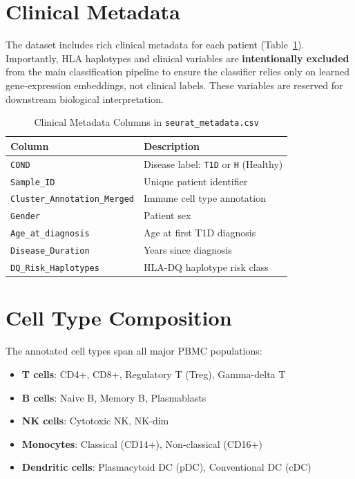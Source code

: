 \section{Clinical Metadata}

The dataset includes rich clinical metadata for each patient (Table~\ref{tab:metadata}). Importantly, HLA haplotypes and clinical variables are \textbf{intentionally excluded} from the main classification pipeline to ensure the classifier relies only on learned gene-expression embeddings, not clinical labels. These variables are reserved for downstream biological interpretation.

\begin{table}[h!]
\centering
\caption{Clinical Metadata Columns in \texttt{seurat\_metadata.csv}}
\label{tab:metadata}
\begin{tabular}{ll}
\toprule
\textbf{Column} & \textbf{Description} \\
\midrule
\texttt{COND} & Disease label: \texttt{T1D} or \texttt{H} (Healthy) \\
\texttt{Sample\_ID} & Unique patient identifier \\
\texttt{Cluster\_Annotation\_Merged} & Immune cell type annotation \\
\texttt{Gender} & Patient sex \\
\texttt{Age\_at\_diagnosis} & Age at first T1D diagnosis \\
\texttt{Disease\_Duration} & Years since diagnosis \\
\texttt{DQ\_Risk\_Haplotypes} & HLA-DQ haplotype risk class \\
\bottomrule
\end{tabular}
\end{table}

\section{Cell Type Composition}

The annotated cell types span all major PBMC populations:

\begin{itemize}
    \item \textbf{T cells}: CD4+, CD8+, Regulatory T (Treg), Gamma-delta T
    \item \textbf{B cells}: Naive B, Memory B, Plasmablasts
    \item \textbf{NK cells}: Cytotoxic NK, NK-dim
    \item \textbf{Monocytes}: Classical (CD14+), Non-classical (CD16+)
    \item \textbf{Dendritic cells}: Plasmacytoid DC (pDC), Conventional DC (cDC)
\end{itemize}

